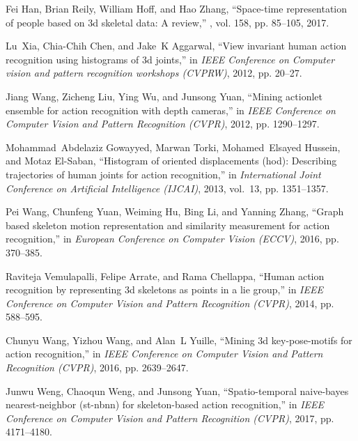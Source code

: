 \documentclass[conference]{IEEEtran}
\begin{document}
\begin{thebibliography}{10}
  Fei Han, Brian Reily, William Hoff, and Hao Zhang,
  \newblock ``Space-time representation of people based on 3d skeletal data: A
    review,''
  , vol. 158, pp.
    85--105, 2017.
  
  Lu~Xia, Chia-Chih Chen, and Jake~K Aggarwal,
  \newblock ``View invariant human action recognition using histograms of 3d
    joints,''
  \newblock in {\em IEEE Conference on Computer vision and pattern recognition
    workshops (CVPRW)}, 2012, pp. 20--27.
  
  Jiang Wang, Zicheng Liu, Ying Wu, and Junsong Yuan,
  \newblock ``Mining actionlet ensemble for action recognition with depth
    cameras,''
  \newblock in {\em IEEE Conference on Computer Vision and Pattern Recognition
    (CVPR)}, 2012, pp. 1290--1297.
  
  Mohammad~Abdelaziz Gowayyed, Marwan Torki, Mohamed~Elsayed Hussein, and Motaz
    El-Saban,
  \newblock ``Histogram of oriented displacements (hod): Describing trajectories
    of human joints for action recognition,''
  \newblock in {\em International Joint Conference on Artificial Intelligence
    (IJCAI)}, 2013, vol.~13, pp. 1351--1357.
  
  Pei Wang, Chunfeng Yuan, Weiming Hu, Bing Li, and Yanning Zhang,
  \newblock ``Graph based skeleton motion representation and similarity
    measurement for action recognition,''
  \newblock in {\em European Conference on Computer Vision (ECCV)}, 2016, pp.
    370--385.
  
  Raviteja Vemulapalli, Felipe Arrate, and Rama Chellappa,
  \newblock ``Human action recognition by representing 3d skeletons as points in
    a lie group,''
  \newblock in {\em IEEE Conference on Computer Vision and Pattern Recognition
    (CVPR)}, 2014, pp. 588--595.
  
  Chunyu Wang, Yizhou Wang, and Alan~L Yuille,
  \newblock ``Mining 3d key-pose-motifs for action recognition,''
  \newblock in {\em IEEE Conference on Computer Vision and Pattern Recognition
    (CVPR)}, 2016, pp. 2639--2647.
  
  Junwu Weng, Chaoqun Weng, and Junsong Yuan,
  \newblock ``Spatio-temporal naive-bayes nearest-neighbor (st-nbnn) for
    skeleton-based action recognition,''
  \newblock in {\em IEEE Conference on Computer Vision and Pattern Recognition
    (CVPR)}, 2017, pp. 4171--4180.
  

\end{thebibliography}
\end{document}
